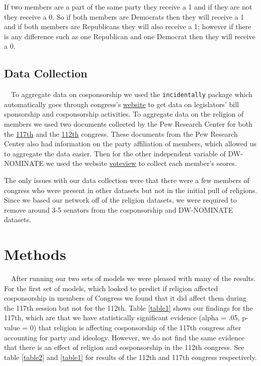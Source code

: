 \documentclass[Royal,times,sageh]{sagej}
\begin{document}
If two members are a part of the same party they receive a 1 and if they
are not they receive a 0. So if both members are Democrats then they
will receive a 1 and if both members are Republicans they will also
receive a 1; however if there is any difference such as one Republican
and one Democrat then they will receive a 0.

\hypertarget{data-collection}{%
\subsection{Data Collection}\label{data-collection}}

\doublespacing

~~To aggregate data on cosponsorship we used the \texttt{incidentally}
package which automatically goes through congress's
\href{https://www.congress.gov/}{website} to get data on legislators'
bill sponsorship and cosponsorship activities. To aggregate data on the
religion of members we used two documents collected by the Pew Research
Center for both the
\href{https://www.pewresearch.org/religion/2021/01/04/faith-on-the-hill-2021/}{117th}
and the
\href{https://www.pewresearch.org/religion/2011/01/05/faith-on-the-hill-the-religious-composition-of-the-112th-congress/\#a-look-back}{112th}
congress. These documents from the Pew Research Center also had
information on the party affiliation of members, which allowed us to
aggregate the data easier. Then for the other independent variable of
DW-NOMINATE we used the website
\href{https://voteview.com/data}{voteview} to collect each member's
scores.

The only issues with our data collection were that there were a few
members of congress who were present in other datasets but not in the
initial pull of religions. Since we based our network off of the
religion datasets, we were required to remove around 3-5 senators from
the cosponsorship and DW-NOMINATE datasets.

\hypertarget{methods}{%
\section{Methods}\label{methods}}

\doublespacing

~~After running our two sets of models we were pleased with many of the
results. For the first set of models, which looked to predict if
religion affected cosponsorship in members of Congress we found that it
did affect them during the 117th session but not for the 112th. Table
\ref{table1} shows our findings for the 117th, which are that we have
statistically significant evidence (alpha = .05, p-value = 0) that
religion is affecting cosponsorship of the 117th congress after
accounting for party and ideology. However, we do not find the same
evidence that there is an effect of religion and cosponsorship in the
112th congress. See table \ref{table2} and \ref{table1} for results of
the 112th and 117th congress respectively.
\end{document}
